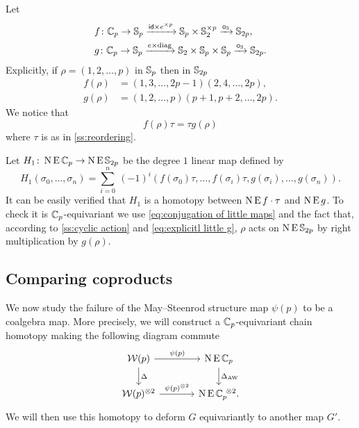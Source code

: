 Let
\[
\begin{split}
	&f \colon \mathbb{C}_p \to \mathbb{S}_p \xrightarrow{\mathsf{id} \times e^{\times p}} \mathbb{S}_p \times \mathbb{S}_2^{\times p} \xrightarrow{\bm{\circ}_{\mathbb{S}}} \mathbb{S}_{2p}, \\
	&g \colon \mathbb{C}_p \to \mathbb{S}_p \xrightarrow{e \times \mathrm{diag}} \mathbb{S}_2 \times \mathbb{S}_p \times \mathbb{S}_p \xrightarrow{\bm{\circ}_{\mathbb{S}}} \mathbb{S}_{2p}.
\end{split}
\]
Explicitly, if $\rho = (1,2,\dots,p)$ in $\mathbb{S}_p$ then in $\mathbb{S}_{2p}$
\begin{align}
	\label{eq:explicitl little f}
	f(\rho) &= (1,3,\dots,2p-1)(2,4,\dots,2p), \\
	\label{eq:explicitl little g}
	g(\rho) &= (1,2,\dots,p)(p+1,p+2,\dots,2p).
\end{align}
We notice that
\begin{equation}\label{eq:conjugation of little maps}
	f(\rho) \tau = \tau g(\rho)
\end{equation}
where $\tau$ is as in \cref{ss:reordering}.

\sssec

Let $H_1 \colon \operatorname{N}\operatorname{E}\mathbb{C}_p \to \operatorname{N}\operatorname{E}\mathbb{S}_{2p}$ be the degree $1$ linear map defined by
\[
H_1(\sigma_0,\dots,\sigma_n) =
\sum_{i=0}^n \ (-1)^i (f(\sigma_0) \tau, \dots, f(\sigma_i) \tau, g(\sigma_i), \dots, g(\sigma_n)).
\]
It can be easily verified that $H_1$ is a homotopy between $\operatorname{N} \operatorname{E} f \cdot \tau$ and $\operatorname{N} \operatorname{E} g$.
To check it is $\mathbb{C}_p$-equivariant we use \cref{eq:conjugation of little maps} and the fact that, according to \cref{ss:cyclic action} and \eqref{eq:explicitl little g}, $\rho$ acts on $\operatorname{N}\operatorname{E}\mathbb{S}_{2p}$ by right multiplication by $g(\rho)$.

\subsection{Comparing coproducts}

We now study the failure of the May--Steenrod structure map $\psi(p)$ to be a coalgebra map.
More precisely, we will construct a $\mathbb{C}_p$-equivariant chain homotopy making the following diagram commute
\[
\begin{tikzcd}[column sep=large]
	\cW(p) \arrow[r,"\psi(p)"] \arrow[d,"\Delta"] & \chains\EE\cyc_p \arrow[d,"\Delta_{\AW}"]\\
	\cW(p)^{\ot 2} \arrow[r,"\psi(p)^{\ot 2}"] & \chains\EE\cyc_p^{\ \ot 2}.
\end{tikzcd}
\]
We will then use this homotopy to deform $G$ equivariantly to another map $G'$.

